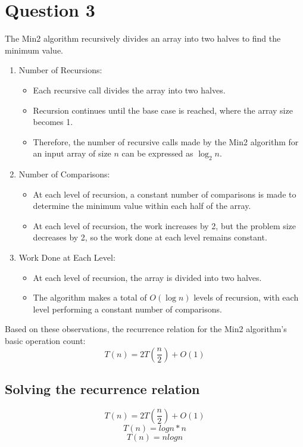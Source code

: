 \documentclass{article}
\begin{document}
\section*{Question 3}
The Min2 algorithm recursively divides an array into two halves to find the minimum value.
\begin{enumerate}
    \item Number of Recursions:
          \begin{itemize}
              \item Each recursive call divides the array into two halves.
              \item Recursion continues until the base case is reached, where the array size becomes 1.
              \item Therefore, the number of recursive calls made by the Min2 algorithm for an input array of size \( n \) can be expressed as \( \log_2{n} \).
          \end{itemize}

    \item Number of Comparisons:
          \begin{itemize}
              \item At each level of recursion, a constant number of comparisons is made to determine the minimum value within each half of the array.
              \item At each level of recursion, the work increases by 2, but the problem size decreases by 2, so the work done at each level remains constant.
          \end{itemize}
    \item Work Done at Each Level:
          \begin{itemize}
              \item At each level of recursion, the array is divided into two halves.
              \item The algorithm makes a total of \( O(\log n) \) levels of recursion, with each level performing a constant number of comparisons.
          \end{itemize}
\end{enumerate}

Based on these observations, the recurrence relation for the Min2 algorithm's basic operation count:
\[ T(n) = 2T\left(\frac{n}{2}\right) + O(1) \]

\subsection*{Solving the recurrence relation}
\[ T(n) = 2T\left(\frac{n}{2}\right) + O(1) \]
\[ T(n) = log n * n \]
\[ T(n) = n log n \]
\end{document}
